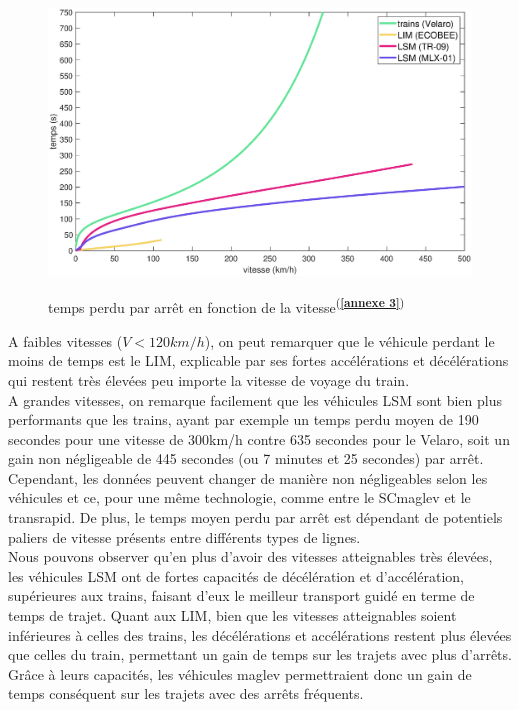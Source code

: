 \documentclass[12pt, a4paper, onecolumn]{article}
\renewcommand{\tab}{\tabto{15px}}
\newcommand{\cfannexe}[1]{\textsuperscript{(\textcolor{blue}{\textbf{\ref{annexe #1}}})}}
\begin{document}
\begin{figure}[H]
  \centering
  \scalebox{0.48}
  {\includegraphics{fig/TP.eps}}
  \label{temps perdu}
  \caption{temps perdu par arrêt en fonction de la vitesse\cfannexe{3}}
\end{figure}



\pagebreak %
\tab A faibles vitesses ($V<120 km/h$), on peut remarquer que le véhicule perdant le moins de temps est le LIM, explicable par ses fortes accélérations et décélérations qui restent très élevées peu importe la vitesse de voyage du train. \\
\linebreak
\tab A grandes vitesses, on remarque facilement que les véhicules LSM sont bien plus performants que les trains, ayant par exemple un temps perdu moyen de 190 secondes pour une vitesse de 300km/h contre 635 secondes pour le Velaro, soit un gain non négligeable de 445 secondes (ou 7 minutes et 25 secondes) par arrêt.
Cependant, les données peuvent changer de manière non négligeables selon les véhicules et ce, pour une même technologie, comme entre le SCmaglev et le transrapid.
De plus, le temps moyen perdu par arrêt est dépendant de potentiels paliers de vitesse présents entre différents types de lignes. \\
\linebreak
\tab Nous pouvons observer qu'en plus d'avoir des vitesses atteignables très élevées, les véhicules LSM ont de fortes capacités de décélération et d'accélération, supérieures aux trains, faisant d’eux le meilleur transport guidé en terme de temps de trajet.
Quant aux LIM, bien que les vitesses atteignables soient inférieures à celles des trains, les décélérations et accélérations restent plus élevées que celles du train, permettant un gain de temps sur les trajets avec plus d’arrêts.
Grâce à leurs capacités, les véhicules maglev permettraient donc un gain de temps conséquent sur les trajets avec des arrêts fréquents. \\
\end{document}
